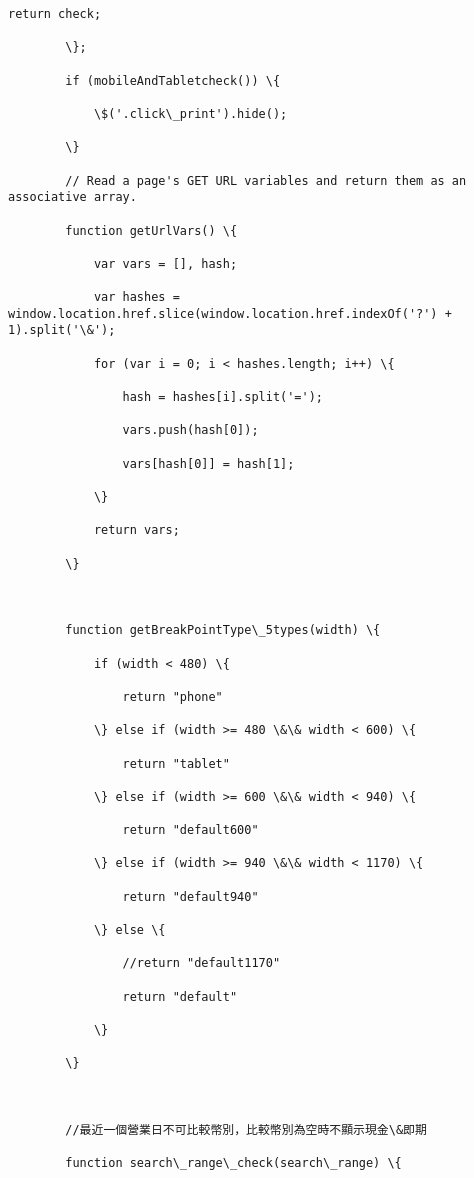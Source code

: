 \documentclass[11pt]{article}
\begin{document}
\begin{Verbatim}[commandchars=\\\{\}]
            return check;

        \};

        if (mobileAndTabletcheck()) \{

            \$('.click\_print').hide();

        \}

        // Read a page's GET URL variables and return them as an associative array.

        function getUrlVars() \{

            var vars = [], hash;

            var hashes = window.location.href.slice(window.location.href.indexOf('?') + 1).split('\&');

            for (var i = 0; i < hashes.length; i++) \{

                hash = hashes[i].split('=');

                vars.push(hash[0]);

                vars[hash[0]] = hash[1];

            \}

            return vars;

        \}



        function getBreakPointType\_5types(width) \{

            if (width < 480) \{

                return "phone"

            \} else if (width >= 480 \&\& width < 600) \{

                return "tablet"

            \} else if (width >= 600 \&\& width < 940) \{

                return "default600"

            \} else if (width >= 940 \&\& width < 1170) \{

                return "default940"

            \} else \{

                //return "default1170"

                return "default"

            \}

        \}



        //最近一個營業日不可比較幣別，比較幣別為空時不顯示現金\&即期

        function search\_range\_check(search\_range) \{


\end{Verbatim}
\end{document}
